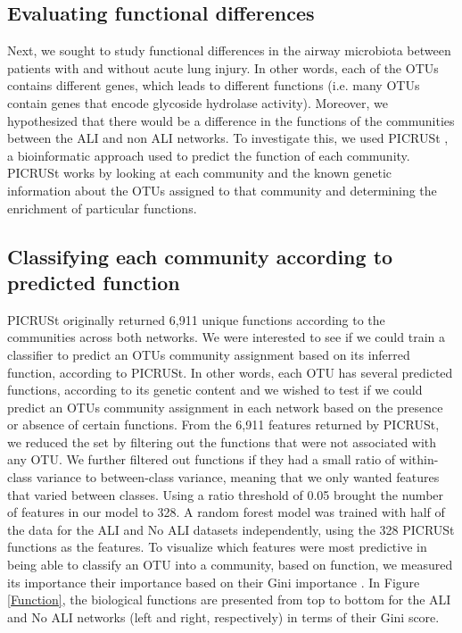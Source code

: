 \subsection{Evaluating functional differences}
\indent Next, we sought to study functional differences in the airway microbiota between patients with and without acute lung injury. In other words, each of the OTUs contains different genes, which leads to different functions (i.e. many OTUs contain genes that encode glycoside hydrolase activity). Moreover, we hypothesized that there would be a difference in the functions of the communities between the ALI and non ALI networks. To investigate this, we used PICRUSt \cite{picrust}, a bioinformatic approach used to predict the function of each community. PICRUSt works by looking at each community and the known genetic information about the OTUs assigned to that community and determining the enrichment of particular functions. 

\subsection{Classifying each community according to predicted function}
\indent PICRUSt originally returned 6,911 unique functions according to the communities across both networks. We were interested to see if we could train a classifier to predict an OTUs community assignment based on its inferred function, according to PICRUSt. In other words, each OTU has several predicted functions, according to its genetic content and we wished to test if we could predict an OTUs community assignment in each network based on the presence or absence of certain functions. From the 6,911 features returned by PICRUSt, we reduced the set by filtering out the functions that were not associated with any OTU. We further filtered out functions if they had a small ratio of within-class variance to between-class variance, meaning that we only wanted features that varied between classes. Using a ratio threshold of 0.05 brought the number of features in our model to 328. A random forest model was trained with half of the data for the ALI and No ALI datasets independently, using the 328 PICRUSt functions as the features.  To visualize which features were most predictive in being able to classify an OTU into a community, based on function, we measured its importance their importance based on their Gini importance \cite{gini}. In Figure \ref{Function}, the biological functions are presented from top to bottom for the ALI and No ALI networks (left and right, respectively) in terms of their Gini score.

